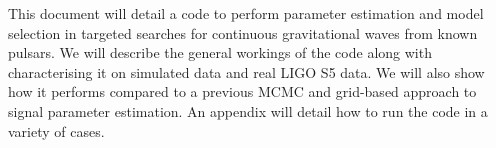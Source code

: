 This document will detail a code to perform parameter estimation and model selection in targeted
searches for continuous gravitational waves from known pulsars. We will describe the general
workings of the code along with characterising it on simulated data and real LIGO S5 data.
We will also show how it performs compared to a previous MCMC and grid-based approach to signal
parameter estimation. An appendix will detail how to run the code in a variety of cases.
